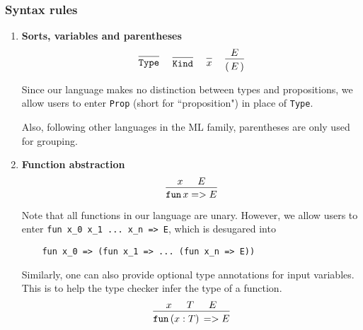 \documentclass{article}
\begin{document}
\subsubsection{Syntax rules}
\begin{enumerate}
\item \textbf{Sorts, variables and parentheses} \\
  \begin{gather*}
    \begin{prooftree}
      \infer0{\Type}
    \end{prooftree}
    ~ \quad
    \begin{prooftree}
      \infer0{\Kind}
    \end{prooftree}
    ~ \quad
    \begin{prooftree}
      \infer0{x}
    \end{prooftree}
    ~ \quad
    \begin{prooftree}
      \hypo{E}
      \infer1{( \, E \, )}
    \end{prooftree}
  \end{gather*}

  Since our language makes no distinction between types and propositions,
  we allow users to enter \verb|Prop| (short for ``proposition") in place of 
  \verb|Type|.

  Also, following other languages in the ML family, parentheses are only used
  for grouping.

\item \textbf{Function abstraction} \\
  \[
    \begin{prooftree}
      \hypo{x}
      \hypo{E}
      \infer2{\fun \, x => E}
    \end{prooftree}
  \]

  Note that all functions in our language are unary. However, we allow users
  to enter \verb|fun x_0 x_1 ... x_n => E|, which is desugared into
  \begin{verbatim}
    fun x_0 => (fun x_1 => ... (fun x_n => E))
  \end{verbatim}

  Similarly, one can also provide optional type annotations for input variables.
  This is to help the type checker infer the type of a function.
  \[
    \begin{prooftree}
      \hypo{x}
      \hypo{T}
      \hypo{E}
      \infer3{\fun \, (x : T) \, => E}
    \end{prooftree}
  \]


\end{enumerate}
\end{document}
